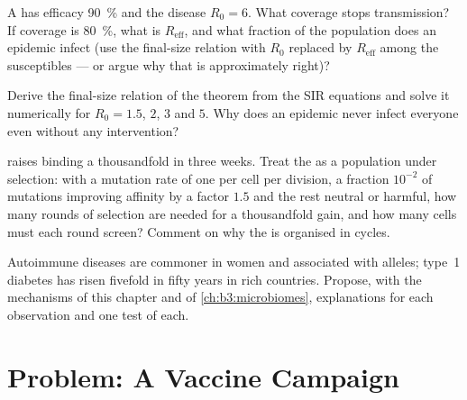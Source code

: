 \begin{exercise}[$\star\star$]\label{exo:b3:adaptive-immunity:9}
A  has efficacy \qty{90}{\%} and the disease $R_{0} = 6$. What
coverage stops transmission? If coverage is \qty{80}{\%}, what is
$R_{\text{eff}}$, and what fraction of the population does an epidemic
infect (use the final-size relation with $R_{0}$ replaced by
$R_{\text{eff}}$ among the susceptibles --- or argue why that is
approximately right)?
\end{exercise}

\begin{exercise}[$\star\star\star$]\label{exo:b3:adaptive-immunity:10}
Derive the final-size relation of the theorem from the SIR equations
and solve it numerically for $R_{0} = 1.5$, $2$, $3$ and $5$. Why does
an epidemic never infect everyone even without any intervention?
\end{exercise}

\begin{exercise}[$\star\star\star$]\label{exo:b3:adaptive-immunity:11}
 raises binding a thousandfold in three weeks.
Treat the  as a population under selection: with a
mutation rate of one per cell per division, a fraction $10^{-2}$ of
mutations improving affinity by a factor $1.5$ and the rest neutral or
harmful, how many rounds of selection are needed for a thousandfold
gain, and how many cells must each round screen? Comment on why the
 is organised in cycles.
\end{exercise}

\begin{exercise}[$\star\star\star$]\label{exo:b3:adaptive-immunity:12}
Autoimmune diseases are commoner in women and associated with 
alleles; type~1 diabetes has risen fivefold in fifty years in rich
countries. Propose, with the mechanisms of this chapter and of
\cref{ch:b3:microbiomes}, explanations for each observation and one
test of each.
\end{exercise}

\section{Problem: A Vaccine Campaign}

